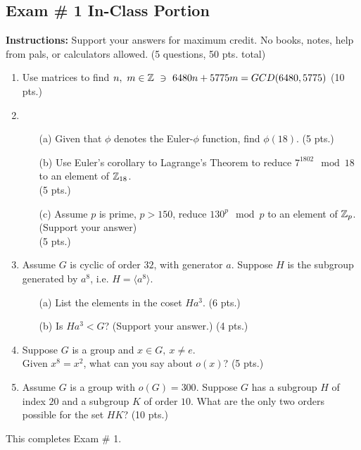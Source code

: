 \subsection{Exam \# 1 In-Class Portion}
\textbf{Instructions:} Support your answers for maximum credit. No books, notes, help from pals, or calculators allowed. (5 questions, 50 pts. total)
\vspace{0.1in}
\begin{enumerate}
    \setlength{\itemsep}{15pt} %
    \item Use matrices to find $n,\ m \in \Z \ \ni \ 6480n+5775m = GCD(6480,5775)$ \hfill (10 pts.)
    \newpage
    \item 
\begin{enumerate}
    \setlength{\itemsep}{10pt} %
    \item[(a)] Given that $\phi$ denotes the Euler-$\phi$ function, find $\phi(18)$. \hfill (5 pts.)
    \vspace{2.25in}
    \item[(b)] Use Euler's corollary to Lagrange's Theorem to reduce $7^{1802}\mod 18$ to an element of ${\mathbb{ Z}}_{18}$. \\ 
    \mbox{} \hfill (5 pts.)
    \vspace{2.25in}
    \item[(c)] Assume $p$ is prime, $p>150$, reduce $130^p \mod p$ to an element of ${\mathbb{ Z}}_p$. (Support your answer) \\ 
    \mbox{} \hfill (5 pts.)
    
\end{enumerate}
\newpage
\item Assume $G$ is cyclic of order $32$, with generator $a$. Suppose $H$ is the subgroup generated by $a^8$, i.e. $H= \langle a^8 \rangle$.
\begin{enumerate}
    \setlength{\itemsep}{10pt} %
    \item[(a)] List the elements in the coset $Ha^3$. \hfill (6 pts.)
    \vspace{2.5in}
    \item[(b)] Is $Ha^3<G$? (Support your answer.) \hfill (4 pts.)
    \vspace{2.5in}
\end{enumerate}
\item Suppose $G$ is a group and $x\in G, \ x\neq e$. \\
Given $x^8=x^2$, what can you say about $o(x)$? \hfill (5 pts.)
\newpage
\item Assume $G$ is a group with $o(G)=300$. Suppose $G$ has a subgroup $H$ of index $20$ and a subgroup $K$ of order $10$. What are the only two orders possible for the set $HK$? \hfill (10 pts.)
\end{enumerate}
\vfill
\begin{tcolorbox}
    \begin{center}
        This completes Exam \# 1.
    \end{center}
\end{tcolorbox}
\newpage
